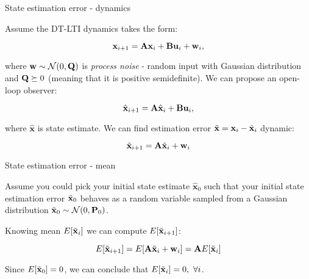 \documentclass{beamer}
\newcommand{\bhat}[1] {\hat{\mathbf{#1}}}
\newcommand{\btil}[1] {\Tilde{\mathbf{#1}}}
\begin{document}
\begin{frame}{State estimation error - dynamics}
	\begin{flushleft}
		
		Assume the DT-LTI dynamics takes the form:
		
		\begin{equation}
			\mathbf{x}_{i+1} = \mathbf{A} \mathbf{x}_i + \mathbf{B} \mathbf{u}_i + \mathbf{w}_i,
		\end{equation}
		
		where $\mathbf{w} \sim \mathcal{N} (0, \mathbf{Q})$ is \emph{process noise} - random input with Gaussian distribution and $\mathbf{Q} \succeq 0$ (meaning that it is positive semidefinite). We can propose an open-loop observer:
		
		\begin{equation}
			\bhat{x}_{i+1} = \bo{A} \bhat{x}_i + \bo{B} \bo{u}_i, 
		\end{equation}
		
		where $\bhat{x}$ is state estimate. We can find estimation error $\btil{x} = \bo{x}_i - \bhat{x}_i$ dynamic:
		
		\begin{equation}
			\btil{x}_{i+1} = \bo{A} \btil{x}_i + \bo{w}_i
		\end{equation}
		
	\end{flushleft}
\end{frame}



\begin{frame}{State estimation error - mean}
	\begin{flushleft}
		
		Assume you could pick your initial state estimate $\bhat{x}_0$ such that your initial state estimation error $\btil{x}_0$ behaves as a random variable sampled from a  Gaussian distribution $\btil{x}_0 \sim \mathcal{N} (0, \bo{P}_0)$.
		
		\bigskip
		
		Knowing mean $E[\btil{x}_i]$ we can compute $E[\btil{x}_{i+1}]$:
		
		\begin{equation}
			E[\btil{x}_{i+1}] = E[\bo{A} \btil{x}_i + \bo{w}_i] = 
			\bo{A} E[\btil{x}_i]
		\end{equation}		
	
		Since $E[\btil{x}_0] = 0$, we can conclude that $E[\btil{x}_i] = 0, \ \forall i$.
		
		
	\end{flushleft}
\end{frame}
\end{document}
